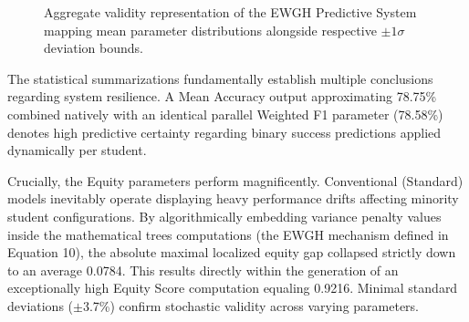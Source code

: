 \documentclass[conference]{IEEEtran}
\begin{document}
\begin{figure}[h]
\centering
{}
\caption{Aggregate validity representation of the EWGH Predictive System mapping mean parameter distributions alongside respective $\pm 1 \sigma$ deviation bounds.}
\label{fig:ewgh_graph}
\end{figure}

The statistical summarizations fundamentally establish multiple conclusions regarding system resilience. A Mean Accuracy output approximating 78.75\% combined natively with an identical parallel Weighted F1 parameter (78.58\%) denotes high predictive certainty regarding binary success predictions applied dynamically per student. 

Crucially, the Equity parameters perform magnificently. Conventional (Standard) models inevitably operate displaying heavy performance drifts affecting minority student configurations. By algorithmically embedding variance penalty values inside the mathematical trees computations (the EWGH mechanism defined in Equation 10), the absolute maximal localized equity gap collapsed strictly down to an average 0.0784. This results directly within the generation of an exceptionally high Equity Score computation equaling 0.9216. Minimal standard deviations ($\pm$3.7\%) confirm stochastic validity across varying parameters. 
\end{document}
